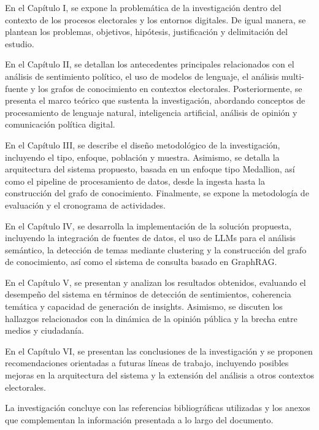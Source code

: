 \documentclass[listof=nochaptergap,12pt,times,authoryear]{report}
\begin{document}
En el Capítulo I, se expone la problemática de la investigación dentro del contexto de los procesos electorales y los entornos digitales. De igual manera, se plantean los problemas, objetivos, hipótesis, justificación y delimitación del estudio.

En el Capítulo II, se detallan los antecedentes principales relacionados con el análisis de sentimiento político, el uso de modelos de lenguaje, el análisis multi-fuente y los grafos de conocimiento en contextos electorales. Posteriormente, se presenta el marco teórico que sustenta la investigación, abordando conceptos de procesamiento de lenguaje natural, inteligencia artificial, análisis de opinión y comunicación política digital.

En el Capítulo III, se describe el diseño metodológico de la investigación, incluyendo el tipo, enfoque, población y muestra. Asimismo, se detalla la arquitectura del sistema propuesto, basada en un enfoque tipo Medallion, así como el pipeline de procesamiento de datos, desde la ingesta hasta la construcción del grafo de conocimiento. Finalmente, se expone la metodología de evaluación y el cronograma de actividades.

En el Capítulo IV, se desarrolla la implementación de la solución propuesta, incluyendo la integración de fuentes de datos, el uso de LLMs para el análisis semántico, la detección de temas mediante clustering y la construcción del grafo de conocimiento, así como el sistema de consulta basado en GraphRAG.

En el Capítulo V, se presentan y analizan los resultados obtenidos, evaluando el desempeño del sistema en términos de detección de sentimientos, coherencia temática y capacidad de generación de insights. Asimismo, se discuten los hallazgos relacionados con la dinámica de la opinión pública y la brecha entre medios y ciudadanía.

En el Capítulo VI, se presentan las conclusiones de la investigación y se proponen recomendaciones orientadas a futuras líneas de trabajo, incluyendo posibles mejoras en la arquitectura del sistema y la extensión del análisis a otros contextos electorales.

La investigación concluye con las referencias bibliográficas utilizadas y los anexos que complementan la información presentada a lo largo del documento.
\end{document}
